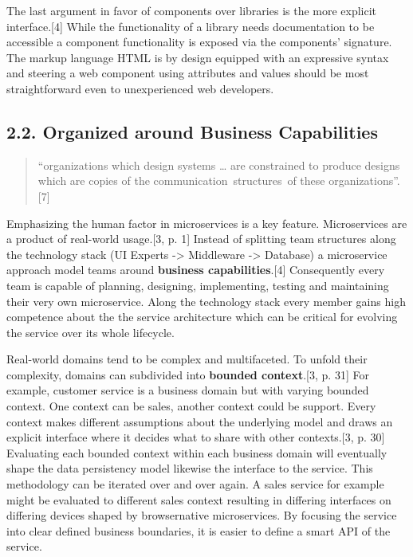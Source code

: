 \documentclass[]{article}
\begin{document}
The last argument in favor of components over libraries is the more
explicit interface.{[}4{]} While the functionality of a library needs
documentation to be accessible a component functionality is exposed via
the components' signature. The markup language HTML is by design
equipped with an expressive syntax and steering a web component using
attributes and values should be most straightforward even to
unexperienced web developers.

\subsection{2.2. Organized around Business
Capabilities}\label{organized-around-business-capabilities}

\begin{quote}
``organizations which design systems \ldots{} are constrained to produce
designs which are copies of the communication~structures~of these
organizations''. {[}7{]}
\end{quote}

Emphasizing the human factor in microservices is a key feature.
Microservices are a product of real-world usage.{[}3, p. 1{]} Instead of
splitting team structures along the technology stack (UI Experts
-\textgreater{} Middleware -\textgreater{} Database) a microservice
approach model teams around \textbf{business capabilities}.{[}4{]}
Consequently every team is capable of planning, designing, implementing,
testing and maintaining their very own microservice. Along the
technology stack every member gains high competence about the the
service architecture which can be critical for evolving the service over
its whole lifecycle.

Real-world domains tend to be complex and multifaceted. To unfold their
complexity, domains can subdivided into \textbf{bounded context}.{[}3,
p. 31{]} For example, customer service is a business domain but with
varying bounded context. One context can be sales, another context could
be support. Every context makes different assumptions about the
underlying model and draws an explicit interface where it decides what
to share with other contexts.{[}3, p. 30{]} Evaluating each bounded
context within each business domain will eventually shape the data
persistency model likewise the interface to the service. This
methodology can be iterated over and over again. A sales service for
example might be evaluated to different sales context resulting in
differing interfaces on differing devices shaped by browsernative
microservices. By focusing the service into clear defined business
boundaries, it is easier to define a smart API of the service.
\end{document}
